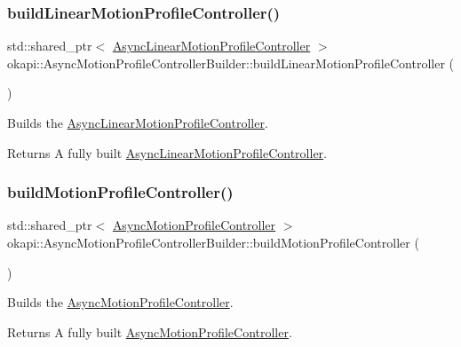 \subsubsection{\texorpdfstring{buildLinearMotionProfileController()}{buildLinearMotionProfileController()}}
{\footnotesize\ttfamily std\+::shared\+\_\+ptr$<$ \mbox{\hyperlink{classokapi_1_1AsyncLinearMotionProfileController}{Async\+Linear\+Motion\+Profile\+Controller}} $>$ okapi\+::\+Async\+Motion\+Profile\+Controller\+Builder\+::build\+Linear\+Motion\+Profile\+Controller (\begin{DoxyParamCaption}{ }\end{DoxyParamCaption})}

Builds the \mbox{\hyperlink{classokapi_1_1AsyncLinearMotionProfileController}{Async\+Linear\+Motion\+Profile\+Controller}}.

\begin{DoxyReturn}{Returns}
A fully built \mbox{\hyperlink{classokapi_1_1AsyncLinearMotionProfileController}{Async\+Linear\+Motion\+Profile\+Controller}}. 
\end{DoxyReturn}
\mbox{\label{classokapi_1_1AsyncMotionProfileControllerBuilder_a2cd170fa280414c388a0106fee23638c}} 
\subsubsection{\texorpdfstring{buildMotionProfileController()}{buildMotionProfileController()}}
{\footnotesize\ttfamily std\+::shared\+\_\+ptr$<$ \mbox{\hyperlink{classokapi_1_1AsyncMotionProfileController}{Async\+Motion\+Profile\+Controller}} $>$ okapi\+::\+Async\+Motion\+Profile\+Controller\+Builder\+::build\+Motion\+Profile\+Controller (\begin{DoxyParamCaption}{ }\end{DoxyParamCaption})}

Builds the \mbox{\hyperlink{classokapi_1_1AsyncMotionProfileController}{Async\+Motion\+Profile\+Controller}}.

\begin{DoxyReturn}{Returns}
A fully built \mbox{\hyperlink{classokapi_1_1AsyncMotionProfileController}{Async\+Motion\+Profile\+Controller}}. 
\end{DoxyReturn}
\mbox{\label{classokapi_1_1AsyncMotionProfileControllerBuilder_a5808aa809738b4249e4f8551a423dc10}} 
